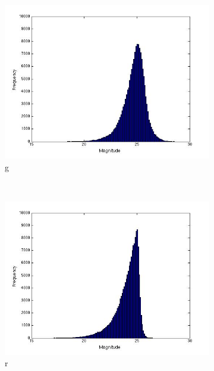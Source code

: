 \documentclass[useAMS,usenatbib,fleqn]{mn2e}
\begin{document}
\begin{figure}
        \centering
        \begin{subfigure}[b]{0.2\textwidth}
                \includegraphics[trim = 35px 15px 50px 25px, clip=true,width=\textwidth]{figures/g.jpg}
                \caption{g}
        \end{subfigure}
        ~
        \begin{subfigure}[b]{0.2\textwidth}
                \includegraphics[trim = 35px 15px 50px 25px, clip=true,width=\textwidth]{figures/r.jpg}
                \caption{r}
        \end{subfigure}
         ~
        \begin{subfigure}[b]{0.2\textwidth}

\end{subfigure}
\end{figure}
\end{document}
